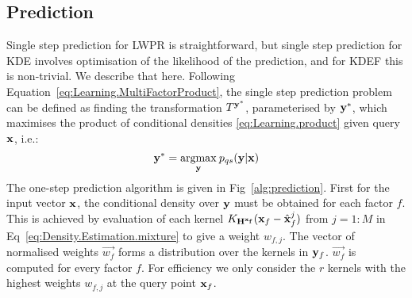 \subsection{Prediction}
Single step prediction for LWPR is straightforward, but single step prediction for KDE involves optimisation of the likelihood of the prediction, and for KDEF this is non-trivial. We describe that here. Following Equation~\eqref{eq:Learning.MultiFactorProduct},
the single step prediction problem can be defined as finding the
transformation $T^{\mathbf{y}^*}$, parameterised by $\mathbf{y}^*$, which maximises the product of conditional densities
\eqref{eq:Learning.product} given query $\mathbf{x}$, i.e.:
\begin{equation}
 \mathbf{y}^*= \underset{\mathbf{y}}{\operatorname{argmax}}\medspace p_{qs}(\mathbf{y}|\mathbf{x})
\label{eq:Density.Estimation.max}
\end{equation}
The one-step prediction algorithm is given in Fig~\ref{alg:prediction}. First for the input vector $\mathbf{x}$, the conditional density over $\mathbf{y}$ must be obtained for each factor $f$. This is achieved by evaluation of each kernel  $K_{\mathbf{H^{\mathbf{x}_f}}}(\mathbf{x}_f - \hat{\mathbf{x}}_f^j)$ from $j=1:M$ in Eq~\eqref{eq:Density.Estimation.mixture} to give a weight $w_{f,j}$. The vector of normalised weights $\vec{w_f}$ forms a distribution over the kernels in $\mathbf{y}_f$. $\vec{w_f}$ is computed for every factor $f$. For efficiency we only consider the $r$ kernels with the highest weights $w_{f,j}$ at the query point $\mathbf{x}_f$. 

